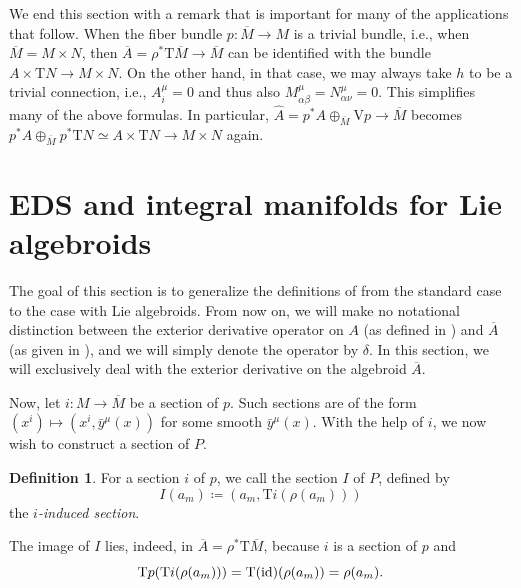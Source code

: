 \documentclass[11pt]{article}
\theoremstyle{plain}
\theoremstyle{definition}
\newtheorem{definition}{Definition}
\begin{document}
We end this section with a remark that is important for many of the applications that follow. When the fiber bundle $p\colon \overline M \to M$ is a trivial bundle, i.e., when $\overline M = M\times N$, then $\overline A = \rho^* \mathrm{T}\overline M \to \overline M$ can be identified with the bundle $A \times \mathrm{T}N \to M\times N$. On the other hand, in that case, we may always take $h$ to be a trivial connection, i.e., $A^\mu_i = 0$ and thus also $M^\mu_{\alpha\beta} = N^\mu_{\alpha\nu}=0$. This simplifies many of the above formulas. In particular, ${\widehat A}=p^{\ast}A\oplus_{\overline{M}} \mathrm{V}p \to \overline M$ becomes $p^{\ast}A\oplus_{\overline{M}}p^*\mathrm{T}N\simeq A\times \mathrm{T}N \to M \times N$ again.




\section{EDS and integral manifolds for Lie algebroids}\label{sec:EDSintman}
The goal of this section is to generalize the definitions of \cite{bryant1991exterior,ivey2016cartan} from the standard case to the case with Lie algebroids. From now on, we will make no notational distinction between the exterior derivative operator on $A$ (as defined in ) and $\overline{A}$ (as given in ), and we will simply denote the operator by $\delta$. In this section, we will exclusively deal with the exterior derivative on the algebroid $\overline{A}$.


Now, let $i\colon M\to \overline{M}$ be a section of $p$. Such sections are of the form $(x^i)\mapsto (x^i,\bar{y}^{\mu}(x))$ for some smooth $\bar{y}^{\mu}(x)$. With the help of $i$, we now wish to construct a section of $P$. 

\begin{definition}
For a section $i$ of $p$, we call the section $I$ of $P$, defined by
\begin{equation*}
    I(a_m)\coloneqq ( a_m, \mathrm{T}i(\rho(a_m)))
\end{equation*}
the \emph{$i$-induced section}. 
\end{definition}
The image of $I$ lies, indeed, in $\overline A= \rho^* \mathrm{T}{\overline M}$, because $i$ is a section of $p$ and
\begin{equation*}
    \mathrm{T}p( \mathrm{T}i(\rho(a_m))) = \mathrm{T}({\rm{id}}) (\rho(a_m)) = \rho(a_m).
\end{equation*}
\end{document}
